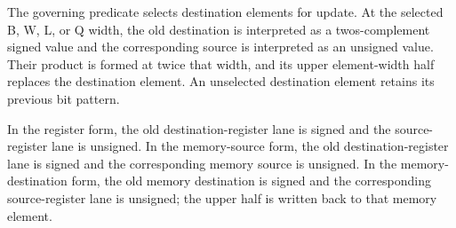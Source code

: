 The governing predicate selects destination elements for update. At the
selected B, W, L, or Q width, the old destination is interpreted as a
two\textquotesingle{}s-complement signed value and the corresponding source is interpreted as an
unsigned value. Their product is formed at twice that width, and its upper
element-width half replaces the destination element. An unselected destination
element retains its previous bit pattern.

In the register form, the old destination-register lane is signed and the
source-register lane is unsigned. In the memory-source form, the old
destination-register lane is signed and the corresponding memory source is
unsigned. In the memory-destination form, the old memory destination is signed
and the corresponding source-register lane is unsigned; the upper half is
written back to that memory element.
